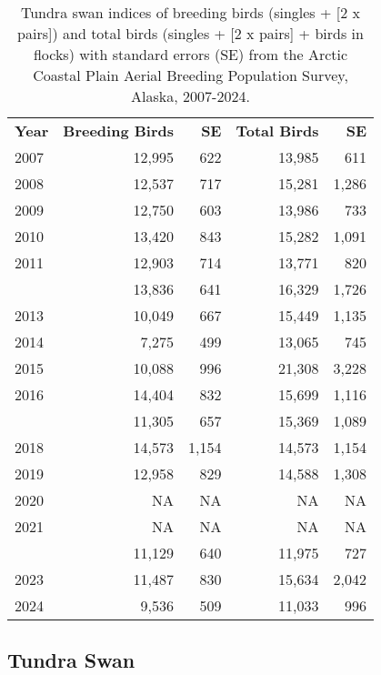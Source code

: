 \documentclass[
]{article}
\begin{document}
\begingroup\fontsize{10}{12}\selectfont

\begin{longtable}[t]{lrrrr}

\caption{\label{tbl-SWAN}Tundra swan indices of breeding birds (singles
+ {[}2 x pairs{]}) and total birds (singles + {[}2 x pairs{]} + birds in
flocks) with standard errors (SE) from the Arctic Coastal Plain Aerial
Breeding Population Survey, Alaska, 2007-2024.}

\tabularnewline

\\
\toprule
\textbf{Year} & \textbf{Breeding Birds} & \textbf{SE} & \textbf{Total Birds} & \textbf{SE}\\
\midrule
2007 & 12,995 & 622 & 13,985 & 611\\
2008 & 12,537 & 717 & 15,281 & 1,286\\
2009 & 12,750 & 603 & 13,986 & 733\\
2010 & 13,420 & 843 & 15,282 & 1,091\\
2011 & 12,903 & 714 & 13,771 & 820\\
\addlinespace
2012 & 13,836 & 641 & 16,329 & 1,726\\
2013 & 10,049 & 667 & 15,449 & 1,135\\
2014 & 7,275 & 499 & 13,065 & 745\\
2015 & 10,088 & 996 & 21,308 & 3,228\\
2016 & 14,404 & 832 & 15,699 & 1,116\\
\addlinespace
2017 & 11,305 & 657 & 15,369 & 1,089\\
2018 & 14,573 & 1,154 & 14,573 & 1,154\\
2019 & 12,958 & 829 & 14,588 & 1,308\\
2020 & NA & NA & NA & NA\\
2021 & NA & NA & NA & NA\\
\addlinespace
2022 & 11,129 & 640 & 11,975 & 727\\
2023 & 11,487 & 830 & 15,634 & 2,042\\
2024 & 9,536 & 509 & 11,033 & 996\\
\bottomrule

\end{longtable}

\endgroup{}

\newpage{}

\subsection*{Tundra Swan}\label{tundra-swan-2}
\end{document}
